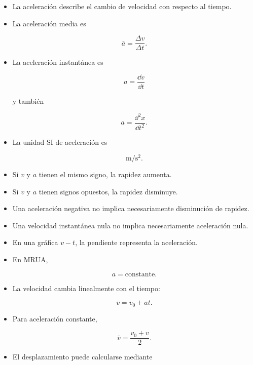 \begin{resumen}

\begin{itemize}

    \item La aceleración describe el cambio de velocidad con respecto al
    tiempo.

    \item La aceleración media es

    \[
    \boxed{\bar{a}=\frac{\Delta v}{\Delta t}}.
    \]

    \item La aceleración instantánea es

    \[
    \boxed{a=\frac{\dd v}{\dd t}}
    \]

    y también

    \[
    \boxed{a=\frac{\dd^2x}{\dd t^2}}.
    \]

    \item La unidad SI de aceleración es

    \[
    \si{\meter\per\second\squared}.
    \]

    \item Si \(v\) y \(a\) tienen el mismo signo, la rapidez aumenta.

    \item Si \(v\) y \(a\) tienen signos opuestos, la rapidez disminuye.

    \item Una aceleración negativa no implica necesariamente disminución de
    rapidez.

    \item Una velocidad instantánea nula no implica necesariamente
    aceleración nula.

    \item En una gráfica \(v-t\), la pendiente representa la aceleración.

    \item En MRUA,

    \[
    \boxed{a=\text{constante}}.
    \]

    \item La velocidad cambia linealmente con el tiempo:

    \[
    \boxed{v=v_0+at}.
    \]

    \item Para aceleración constante,

    \[
    \boxed{\bar{v}=\frac{v_0+v}{2}}.
    \]

    \item El desplazamiento puede calcularse mediante


\end{itemize}
\end{resumen}
